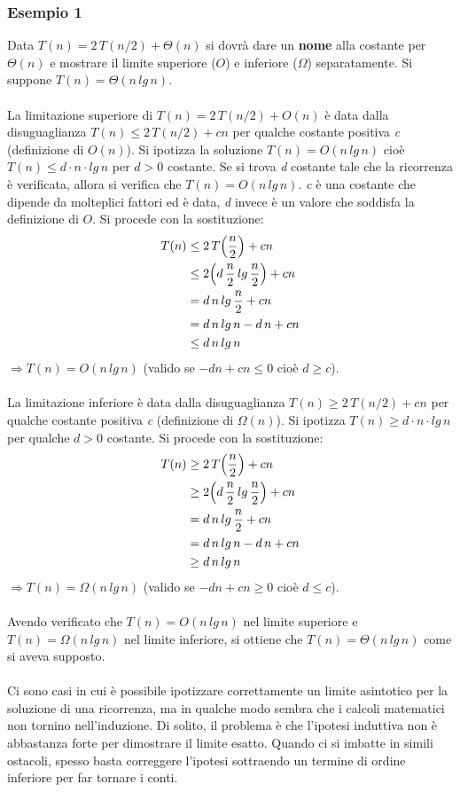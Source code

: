 \documentclass[10pt, a4paper]{report}
\begin{document}
\subsubsection{Esempio 1}
Data $T(n) = 2\,T(n/2) + \Theta(n)$ si dovrà dare un \textbf{nome} alla costante per $\Theta(n)$ e mostrare il limite superiore ($O$) e inferiore ($\Omega$) separatamente. Si suppone $T(n) = \Theta(n\,lg\,n)$.\\\\La limitazione superiore di $T(n) = 2\,T(n/2) + O(n)$ è data dalla disuguaglianza $T(n) \leq 2\,T(n/2) + cn$ per qualche costante positiva \textit{c} (definizione di $O(n)$). Si ipotizza la soluzione $T(n) = O(n\,lg\,n)$ cioè $T(n) \leq d\cdot n\cdot lg\,n$ per $d > 0$ costante. Se si trova \textit{d} costante tale che la ricorrenza è verificata, allora si verifica che $T(n) = O(n\,lg\,n)$. \textit{c} è una costante che dipende da molteplici fattori ed è data, \textit{d} invece è un valore che soddisfa la definizione di $O$. Si procede con la sostituzione:
\begin{align*}
T(n) &\leq 2\,T\Bigl(\frac{n}{2}\Bigr) + cn \\
&\leq 2\Bigl(d\,\frac{n}{2}\,lg\,\frac{n}{2}\Bigr) + cn \\
&= d\,n\,lg\,\frac{n}{2} + cn \\
&= d\,n\,lg\,n - d\,n + cn \\
&\leq d\,n\,lg\,n
\end{align*}
$\Rightarrow T(n) = O(n\,lg\,n)$ (valido se $-dn + cn \leq 0$ cioè $d \geq c$).\\\\La limitazione inferiore è data dalla disuguaglianza $T(n) \geq 2\,T(n/2) + cn$ per qualche costante positiva \textit{c} (definizione di $\Omega(n)$). Si ipotizza $T(n) \geq d\cdot n\cdot lg\,n$ per qualche $d > 0$ costante. Si procede con la sostituzione:
\begin{align*}
T(n) &\geq 2\,T\Bigl(\frac{n}{2}\Bigr) + cn \\
&\geq 2\Bigl(d\,\frac{n}{2}\,lg\,\frac{n}{2}\Bigr) + cn \\
&= d\,n\,lg\,\frac{n}{2} + cn \\
&= d\,n\,lg\,n - d\,n + cn \\
&\geq d\,n\,lg\,n
\end{align*}
$\Rightarrow T(n) = \Omega(n\,lg\,n)$ (valido se $-dn + cn \geq 0$ cioè $d \leq c$).\\\\Avendo verificato che $T(n) = O(n\,lg\,n)$ nel limite superiore e $T(n) = \Omega(n\,lg\,n)$ nel limite inferiore, si ottiene che $T(n) = \Theta(n\,lg\,n)$ come si aveva supposto.\\\\Ci sono casi in cui è possibile ipotizzare correttamente un limite asintotico per la soluzione di una ricorrenza, ma in qualche modo sembra che i calcoli matematici non tornino nell'induzione. Di solito, il problema è che l'ipotesi induttiva non è abbastanza forte  per dimostrare il limite esatto. Quando ci si imbatte in simili ostacoli, spesso basta correggere l'ipotesi sottraendo un termine di ordine inferiore per far tornare i conti.
\end{document}
